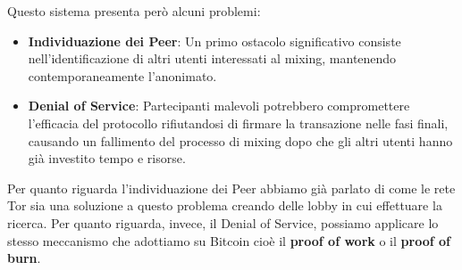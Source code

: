 Questo sistema presenta però alcuni problemi:
\begin{itemize}
    \item \textbf{Individuazione dei Peer}: Un primo ostacolo significativo consiste nell’identificazione di altri utenti interessati al mixing, mantenendo contemporaneamente l’anonimato.
    \item \textbf{Denial of Service}: Partecipanti malevoli potrebbero compromettere l’efficacia del protocollo rifiutandosi di firmare la transazione nelle fasi finali, causando un fallimento del processo di mixing dopo che gli altri utenti hanno già investito tempo e risorse.
\end{itemize}
Per quanto riguarda l'individuazione dei Peer abbiamo già parlato di come le rete Tor sia una soluzione a questo problema creando delle lobby in cui effettuare la ricerca. 
Per quanto riguarda, invece, il Denial of Service, possiamo applicare lo stesso meccanismo che adottiamo su Bitcoin cioè il \textbf{proof of work} o il \textbf{proof of burn}.

